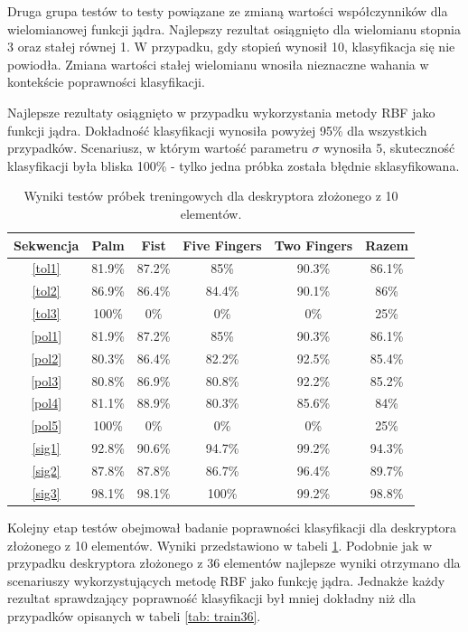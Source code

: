 Druga grupa testów to testy powiązane ze zmianą wartości współczynników dla wielomianowej funkcji jądra. Najlepszy rezultat osiągnięto dla wielomianu stopnia 3 oraz stałej równej 1. W przypadku, gdy stopień wynosił 10, klasyfikacja się nie powiodła. Zmiana wartości stałej wielomianu wnosiła nieznaczne wahania w kontekście poprawności klasyfikacji.

Najlepsze rezultaty osiągnięto w przypadku wykorzystania metody RBF jako funkcji jądra. Dokładność klasyfikacji wynosiła powyżej 95\% dla wszystkich przypadków. Scenariusz, w którym wartość parametru $\sigma$ wynosiła 5, skuteczność klasyfikacji była bliska 100\% - tylko jedna próbka została błędnie sklasyfikowana.

\begin{table} [h!]
	\centering
	\begin{tabular}{|c|c|c|c|c|c|}
		\hline
		\textbf{Sekwencja} 	& \textbf{Palm} & \textbf{Fist} & \textbf{Five Fingers} & \textbf{Two Fingers} & \textbf{Razem} \\ \hline
		\ref{tol1} 	& 81.9\% 		& 87.2\%		& 85\%		& 90.3\% 	& 86.1\% \\ \hline
		\ref{tol2} 	& 86.9\% 		& 86.4\%		& 84.4\%	& 90.1\% 	& 86\% \\ \hline
		\ref{tol3}	& 100\%			& 0\%			& 0\%		& 0\% 		& 25\% \\ \hline \hline
		\ref{pol1} 	& 81.9\% 		& 87.2\%		& 85\%		& 90.3\% 	& 86.1\% \\ \hline
		\ref{pol2} 	& 80.3\% 		& 86.4\%		& 82.2\%	& 92.5\% 	& 85.4\% \\ \hline
		\ref{pol3}	& 80.8\%		& 86.9\%		& 80.8\%	& 92.2\% 	& 85.2\% \\ \hline
		\ref{pol4}	& 81.1\%		& 88.9\%		& 80.3\%	& 85.6\% 	& 84\% \\ \hline
		\ref{pol5}	& 100\%			& 0\%			& 0\%		& 0\% 		& 25\% \\ \hline \hline
		\ref{sig1}	& 92.8\% 		& 90.6\%		& 94.7\%	& 99.2\% 	& 94.3\% \\ \hline
		\ref{sig2}	& 87.8\% 		& 87.8\%		& 86.7\%	& 96.4\% 	& 89.7\% \\ \hline
		\ref{sig3}	& 98.1\%		& 98.1\%		& 100\%		& 99.2\% 	& 98.8\% \\ \hline
	\end{tabular}
	\caption{Wyniki testów próbek treningowych dla deskryptora złożonego z 10 elementów.}
	\label{tab: train10}
\end{table}

Kolejny etap testów obejmował badanie poprawności klasyfikacji dla deskryptora złożonego z 10 elementów. Wyniki przedstawiono w tabeli \ref{tab: train10}.
Podobnie jak w przypadku deskryptora złożonego z 36 elementów najlepsze wyniki otrzymano dla scenariuszy wykorzystujących metodę RBF jako funkcję jądra. Jednakże każdy rezultat sprawdzający poprawność klasyfikacji był mniej dokładny niż dla przypadków opisanych w tabeli \ref{tab: train36}.

